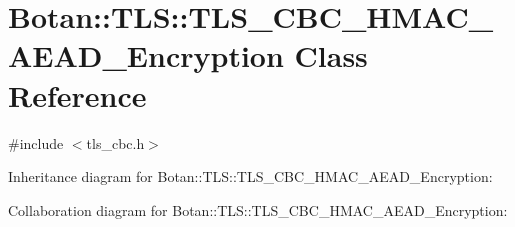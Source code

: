 \hypertarget{class_botan_1_1_t_l_s_1_1_t_l_s___c_b_c___h_m_a_c___a_e_a_d___encryption}{}\section{Botan\+:\+:T\+LS\+:\+:T\+L\+S\+\_\+\+C\+B\+C\+\_\+\+H\+M\+A\+C\+\_\+\+A\+E\+A\+D\+\_\+\+Encryption Class Reference}
\label{class_botan_1_1_t_l_s_1_1_t_l_s___c_b_c___h_m_a_c___a_e_a_d___encryption}


{\ttfamily \#include $<$tls\+\_\+cbc.\+h$>$}



Inheritance diagram for Botan\+:\+:T\+LS\+:\+:T\+L\+S\+\_\+\+C\+B\+C\+\_\+\+H\+M\+A\+C\+\_\+\+A\+E\+A\+D\+\_\+\+Encryption\+:


Collaboration diagram for Botan\+:\+:T\+LS\+:\+:T\+L\+S\+\_\+\+C\+B\+C\+\_\+\+H\+M\+A\+C\+\_\+\+A\+E\+A\+D\+\_\+\+Encryption\+:
